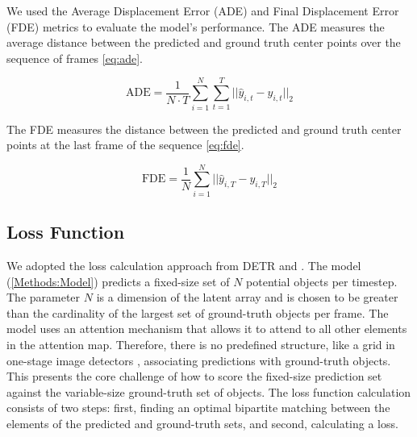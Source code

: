 We used the Average Displacement Error (ADE) and Final Displacement Error (FDE) metrics to evaluate the model's performance. The ADE measures the average distance between the predicted and ground truth center points over the sequence of frames \ref{eq:ade}.

\begin{equation}
    \text{ADE} = \frac{1}{N \cdot T} \sum_{i=1}^{N} \sum_{t=1}^{T} || \hat{y}_{i,t} - y_{i,t} ||_2
    \label{eq:ade}
\end{equation}

The FDE measures the distance between the predicted and ground truth center points at the last frame of the sequence \ref{eq:fde}.

\begin{equation}
    \text{FDE} = \frac{1}{N} \sum_{i=1}^{N} || \hat{y}_{i,T} - y_{i,T} ||_2
    \label{eq:fde}
\end{equation}

\subsection{Loss Function} \label{Methods:LossFunction}

We adopted the loss calculation approach from DETR \cite{carionEndtoEndObjectDetection2020} and \cite{stewartEndtoendPeopleDetection2015}. The model (\ref{Methods:Model}) predicts a fixed-size set of $N$ potential objects per timestep. The parameter $N$ is a dimension of the latent array and is chosen to be greater than the cardinality of the largest set of ground-truth objects per frame. The model uses an attention mechanism that allows it to attend to all other elements in the attention map. Therefore, there is no predefined structure, like a grid in one-stage image detectors \cite{}, associating predictions with ground-truth objects. This presents the core challenge of how to score the fixed-size prediction set against the variable-size ground-truth set of objects. The loss function calculation consists of two steps: first, finding an optimal bipartite matching between the elements of the predicted and ground-truth sets, and second, calculating a loss.

